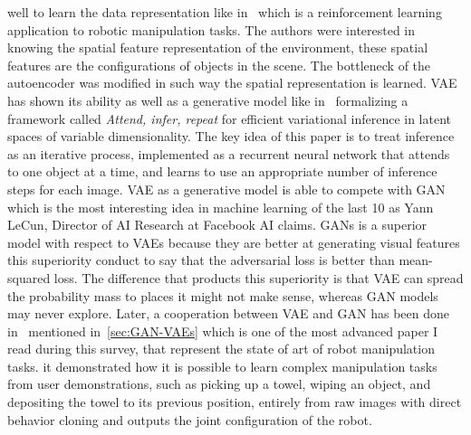 well to learn the data representation like in~\cite{finn2016deep} which is a reinforcement learning application to robotic manipulation tasks. The authors were interested in knowing the spatial feature representation of the environment, these spatial features are the configurations of objects in the scene. The bottleneck of the autoencoder was modified in such way the spatial representation is learned. VAE has shown its ability as well as a generative model like in~\cite{eslami2016attend} formalizing a framework called \textit{Attend, infer, repeat} for efficient variational inference in latent spaces of variable dimensionality. The key idea of this paper is to treat inference as an iterative process, implemented as a recurrent neural network that attends to one object
at a time, and learns to use an appropriate number of inference steps for each image. VAE as a generative model is able to compete with GAN which is the most interesting idea in machine learning of the last 10 as Yann LeCun, Director of AI Research at Facebook AI claims. GANs is a superior model with respect to VAEs because they are better at generating visual features this superiority conduct to say that the adversarial loss is better than mean-squared loss. The difference that products this superiority is that VAE can spread the probability mass to places it might not make sense, whereas GAN models may never explore. Later, a cooperation between VAE and GAN has been done in~\cite{rahmatizadeh2018vision} mentioned in~\ref{sec:GAN-VAEs} which is one of the most advanced paper I read during this survey, that represent the state of art of robot manipulation tasks. it demonstrated how it is possible to learn complex manipulation tasks from user demonstrations, such as picking up a towel, wiping an object, and depositing the towel to its previous position, entirely from raw images with direct behavior cloning and outputs the joint configuration of the robot.\\
